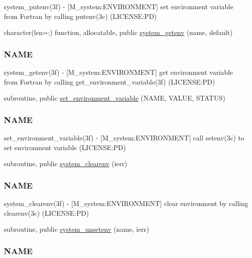 \begin{DoxyCompactItemize}
\begin{DoxyCompactList}
system\+\_\+putenv(3f) -\/ \mbox{[}M\+\_\+system\+:E\+N\+V\+I\+R\+O\+N\+M\+E\+NT\mbox{]} set environment variable from Fortran by calling putenv(3c) (L\+I\+C\+E\+N\+SE\+:PD) \end{DoxyCompactList}\item 
character(len=\+:) function, allocatable, public \mbox{\hyperlink{namespacem__system_a0f91f973a4288ebda0e75ea0869a43af}{system\+\_\+getenv}} (name, default)
\begin{DoxyCompactList}\small\item\em \subsubsection*{N\+A\+ME}

system\+\_\+getenv(3f) -\/ \mbox{[}M\+\_\+system\+:E\+N\+V\+I\+R\+O\+N\+M\+E\+NT\mbox{]} get environment variable from Fortran by calling get\+\_\+environment\+\_\+variable(3f) (L\+I\+C\+E\+N\+SE\+:PD) \end{DoxyCompactList}\item 
subroutine, public \mbox{\hyperlink{namespacem__system_ad813765403a5d9d6fb7a2edcb669fe4b}{set\+\_\+environment\+\_\+variable}} (N\+A\+ME, V\+A\+L\+UE, S\+T\+A\+T\+US)
\begin{DoxyCompactList}\small\item\em \subsubsection*{N\+A\+ME}

set\+\_\+environment\+\_\+variable(3f) -\/ \mbox{[}M\+\_\+system\+:E\+N\+V\+I\+R\+O\+N\+M\+E\+NT\mbox{]} call setenv(3c) to set environment variable (L\+I\+C\+E\+N\+SE\+:PD) \end{DoxyCompactList}\item 
subroutine, public \mbox{\hyperlink{namespacem__system_a9c34787b170ab8d41000d7c3acb60736}{system\+\_\+clearenv}} (ierr)
\begin{DoxyCompactList}\small\item\em \subsubsection*{N\+A\+ME}

system\+\_\+clearenv(3f) -\/ \mbox{[}M\+\_\+system\+:E\+N\+V\+I\+R\+O\+N\+M\+E\+NT\mbox{]} clear environment by calling clearenv(3c) (L\+I\+C\+E\+N\+SE\+:PD) \end{DoxyCompactList}\item 
subroutine, public \mbox{\hyperlink{namespacem__system_a61b67b46b35490ec308773b65c3376a3}{system\+\_\+unsetenv}} (name, ierr)
\begin{DoxyCompactList}\small\item\em \subsubsection*{N\+A\+ME}


\end{DoxyCompactList}
\end{DoxyCompactItemize}
